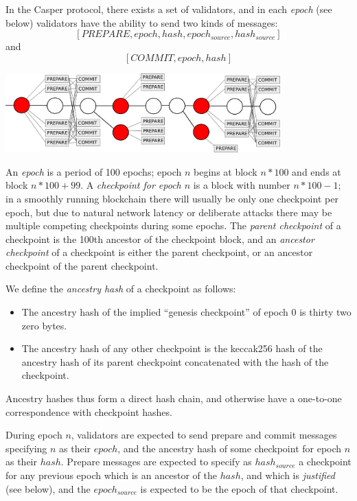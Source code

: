\documentclass[12pt]{article}
\begin{document}
In the Casper protocol, there exists a set of validators, and in each \textit{epoch} (see below) validators have the ability to send two kinds of messages: $$[PREPARE, epoch, hash, epoch_{source}, hash_{source}]$$ and $$[COMMIT, epoch, hash]$$

\includegraphics[width=400px]{prepares_commits.png}

An \textit{epoch} is a period of 100 epochs; epoch $n$ begins at block $n * 100$ and ends at block $n * 100 + 99$. A \textit{checkpoint for epoch $n$} is a block with number $n * 100 - 1$; in a smoothly running blockchain there will usually be only one checkpoint per epoch, but due to natural network latency or deliberate attacks there may be multiple competing checkpoints during some epochs. The \textit{parent checkpoint} of a checkpoint is the 100th ancestor of the checkpoint block, and an \textit{ancestor checkpoint} of a checkpoint is either the parent checkpoint, or an ancestor checkpoint of the parent checkpoint.

We define the \textit{ancestry hash} of a checkpoint as follows:

\begin{itemize}
\item The ancestry hash of the implied ``genesis checkpoint'' of epoch 0 is thirty two zero bytes.
\item The ancestry hash of any other checkpoint is the keccak256 hash of the ancestry hash of its parent checkpoint concatenated with the hash of the checkpoint.
\end{itemize}

Ancestry hashes thus form a direct hash chain, and otherwise have a one-to-one correspondence with checkpoint hashes.

During epoch $n$, validators are expected to send prepare and commit messages specifying $n$ as their $epoch$, and the ancestry hash of some checkpoint for epoch $n$ as their $hash$. Prepare messages are expected to specify as $hash_{source}$ a checkpoint for any previous epoch which is an ancestor of the $hash$, and which is \textit{justified} (see below), and the $epoch_{source}$ is expected to be the epoch of that checkpoint.
\end{document}
